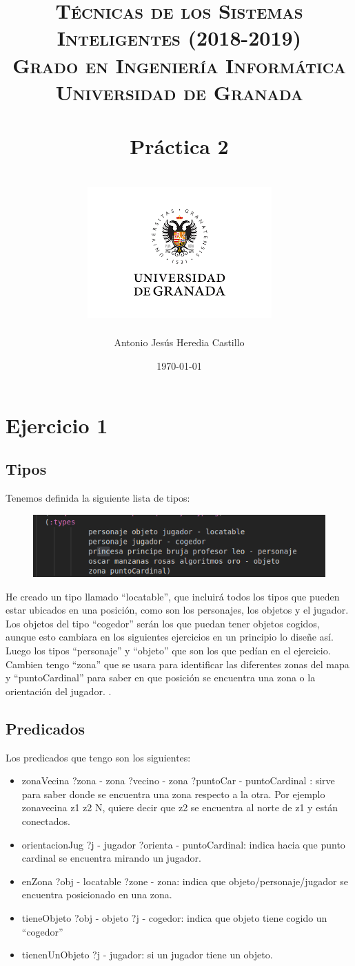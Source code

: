 \documentclass[12pt,a4paper]{article}
\title{
\normalfont \normalsize 
\textsc{{\bf Técnicas de los Sistemas Inteligentes (2018-2019)} \\ Grado en Ingeniería Informática \\ Universidad de Granada} \\ [25pt] %
\horrule{0.5pt} \\[0.4cm] %
\huge Práctica 2 \\ %
\horrule{2pt} \\[0.5cm] %
\includegraphics{images/logo.png}	
}
\author{Antonio Jesús Heredia Castillo} %
\date{\normalsize\today} %
\begin{document}
\maketitle %
\newpage %
\tableofcontents %
\listoffigures
\newpage

\section{Ejercicio 1}
\subsection{Tipos}
Tenemos definida la siguiente lista de tipos:
\begin{figure}[H]
	\centering
	\includegraphics{images/eje1Tipos}
	\caption{}
	\label{fig:eje1tipos}
\end{figure}
He creado un tipo llamado ``locatable'', que incluirá todos los tipos que pueden estar ubicados en una posición, como son los personajes, los objetos y el jugador. Los objetos del tipo ``cogedor'' serán los que puedan tener objetos cogidos, aunque esto cambiara en los siguientes ejercicios en un principio lo diseñe así. Luego los tipos ``personaje'' y ``objeto'' que son los que pedían en el ejercicio. Cambien tengo ``zona'' que se usara para identificar las diferentes zonas del mapa y ``puntoCardinal'' para saber en que posición se encuentra una zona o la orientación del jugador. . 
\subsection{Predicados}
Los predicados que tengo son los siguientes:
\begin{itemize}
	\item zonaVecina ?zona - zona ?vecino - zona ?puntoCar - puntoCardinal : sirve para saber donde se encuentra una zona respecto a la otra. Por ejemplo zonavecina z1 z2 N, quiere decir que z2 se encuentra al norte de z1 y están conectados. 
	\item orientacionJug ?j - jugador ?orienta - puntoCardinal: indica hacia que punto cardinal se encuentra mirando un jugador.
	\item enZona ?obj - locatable ?zone - zona: indica que objeto/personaje/jugador se encuentra posicionado en una zona. 
	\item tieneObjeto ?obj - objeto ?j - cogedor: indica que objeto tiene cogido un ``cogedor''
	\item tienenUnObjeto ?j - jugador: si un jugador tiene un objeto.
	 
\end{itemize}
\end{document}
